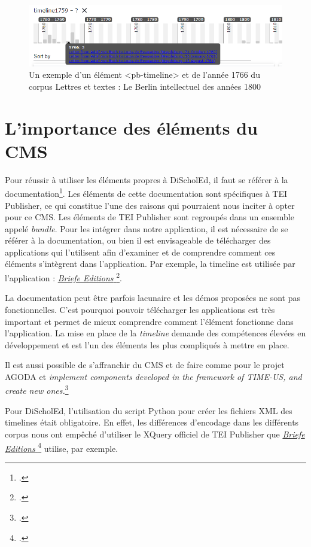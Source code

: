 \begin{figure}[H]
\centering
\includegraphics[width=0.75\linewidth]{schémas/timeline.png}
\caption{Un exemple d'un élément <pb-timeline> et de l'année 1766 du corpus \og{}Lettres et textes : Le Berlin intellectuel des années 1800\fg{}}
\label{fig:schémas06}
\end{figure}


\section{L'importance des éléments du CMS}

Pour réussir à utiliser les éléments propres à DiScholEd, il faut se référer à la documentation\footcite{TEIPublisherWebcomponents}. Les éléments de cette documentation sont spécifiques à TEI Publisher, ce qui constitue l'une des raisons qui pourraient nous inciter à opter pour ce CMS. Les éléments de TEI Publisher sont regroupés dans un ensemble appelé \textit{bundle}. Pour les intégrer dans notre application, il est nécessaire de se référer à la documentation, ou bien il est envisageable de télécharger des applications qui l'utilisent afin d'examiner et de comprendre comment ces éléments s'intègrent dans l'application. Par exemple, la timeline est utilisée par l'application : \href{https://www.briefedition.alfred-escher.ch/briefe/}{\textit{Briefe Editions} \footcite{EditionLettresEdition}}. 

La documentation peut être parfois lacunaire et les démos proposées ne sont pas fonctionnelles. C'est pourquoi pouvoir télécharger les applications est très important et permet de mieux comprendre comment l'élément fonctionne dans l'application. La mise en place de la \textit{timeline} demande des compétences élevées en développement et est l'un des éléments les plus compliqués à mettre en place. 

Il est aussi possible de s'affranchir du CMS et de faire comme pour le projet AGODA et \og{}\textit{implement components developed in the framework of TIME-US, and create new ones.}\footcite{puren:hal-03623351}\fg{}

Pour DiScholEd, l'utilisation du script Python pour créer les fichiers XML des timelines était obligatoire. En effet, les différences d'encodage dans les différents corpus nous ont empêché d'utiliser le XQuery officiel de TEI Publisher que \href{https://www.briefedition.alfred-escher.ch/briefe/}{\textit{Briefe Editions} \footcite{EditionLettresEdition}} utilise, par exemple.

